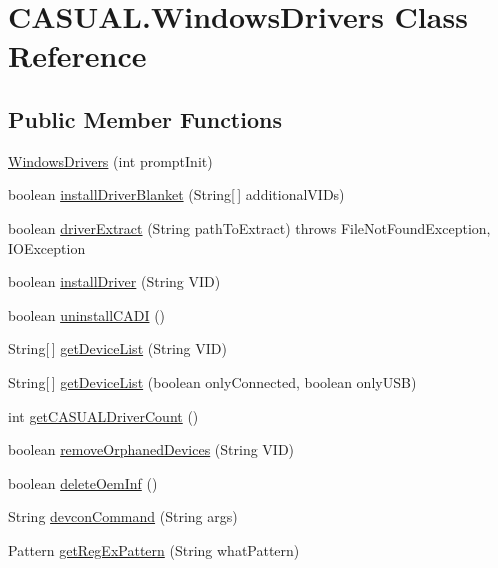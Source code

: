 \hypertarget{classCASUAL_1_1WindowsDrivers}{\section{C\-A\-S\-U\-A\-L.\-Windows\-Drivers Class Reference}
\label{classCASUAL_1_1WindowsDrivers}
}
\subsection*{Public Member Functions}
\begin{DoxyCompactItemize}
\item 
\hyperlink{classCASUAL_1_1WindowsDrivers_abc8fd34531bd322330042a15ee12cb45}{Windows\-Drivers} (int prompt\-Init)
\item 
boolean \hyperlink{classCASUAL_1_1WindowsDrivers_a524af552802bf1b540be25ed43951ed4}{install\-Driver\-Blanket} (String\mbox{[}$\,$\mbox{]} additional\-V\-I\-Ds)
\item 
boolean \hyperlink{classCASUAL_1_1WindowsDrivers_aacf674e2d68c77a3233472ed2b0fad61}{driver\-Extract} (String path\-To\-Extract)  throws File\-Not\-Found\-Exception, I\-O\-Exception 
\item 
boolean \hyperlink{classCASUAL_1_1WindowsDrivers_a8f1ace24411629c85bbf7a2b83e1e41d}{install\-Driver} (String V\-I\-D)
\item 
boolean \hyperlink{classCASUAL_1_1WindowsDrivers_ac7b16da6f902b8f94c8c1032adca94ef}{uninstall\-C\-A\-D\-I} ()
\item 
String\mbox{[}$\,$\mbox{]} \hyperlink{classCASUAL_1_1WindowsDrivers_a36fca4c48d995214a392de34215f3ac3}{get\-Device\-List} (String V\-I\-D)
\item 
String\mbox{[}$\,$\mbox{]} \hyperlink{classCASUAL_1_1WindowsDrivers_aa8d6cd3a7b77cd0ce5a93f505b63d12b}{get\-Device\-List} (boolean only\-Connected, boolean only\-U\-S\-B)
\item 
int \hyperlink{classCASUAL_1_1WindowsDrivers_af79ee2916e52982954c1a23ee528ba57}{get\-C\-A\-S\-U\-A\-L\-Driver\-Count} ()
\item 
boolean \hyperlink{classCASUAL_1_1WindowsDrivers_ab4018b18c1644814531e0099fc744840}{remove\-Orphaned\-Devices} (String V\-I\-D)
\item 
boolean \hyperlink{classCASUAL_1_1WindowsDrivers_a53481235c859dddc8970b96489f3b0a9}{delete\-Oem\-Inf} ()
\item 
String \hyperlink{classCASUAL_1_1WindowsDrivers_ae1d0f834147099460ce8d727baa788e7}{devcon\-Command} (String args)
\item 
Pattern \hyperlink{classCASUAL_1_1WindowsDrivers_aaf953b0c0d0b25e925e57e15f5db1bb0}{get\-Reg\-Ex\-Pattern} (String what\-Pattern)
\end{DoxyCompactItemize}
